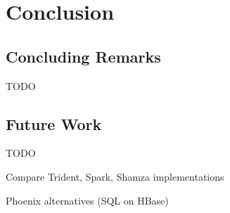 \chapter{Conclusion}\label{chapter:conclusion}

\section{Concluding Remarks}

TODO

\section{Future Work}

TODO

Compare Trident, Spark, Shamza implementations

Phoenix alternatives (SQL on HBase)


\cleardoublepage
